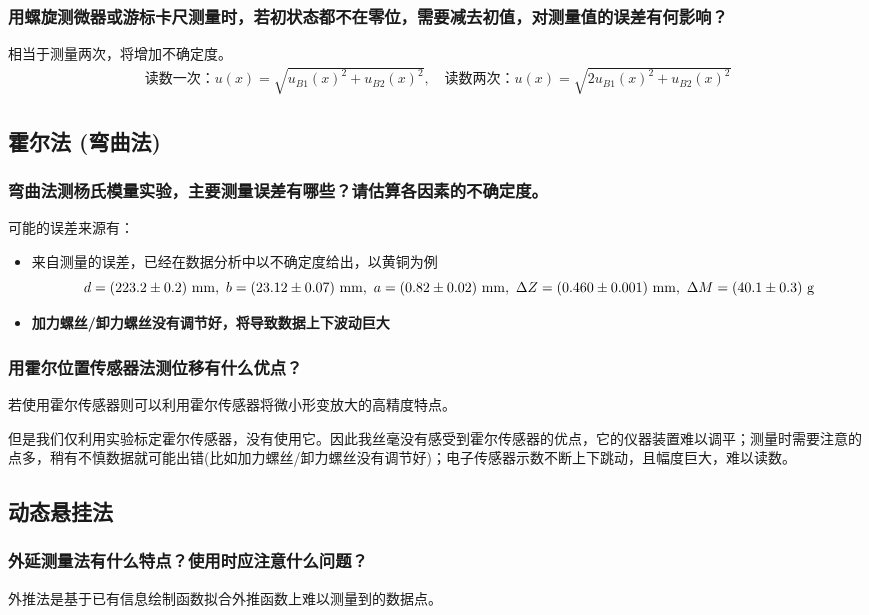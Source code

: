 \documentclass[11pt]{article}
\begin{document}
	\subsubsection{用螺旋测微器或游标卡尺测量时，若初状态都不在零位，需要减去初值，对测量值的误差有何影响？}
	相当于测量两次，将增加不确定度。
	\begin{gather*}
		\text{读数一次：} u(x) = \sqrt{u_{B1}(x)^2 + u_{B2}(x)^2 },\quad 
		\text{读数两次：} u(x) = \sqrt{2u_{B1}(x)^2 + u_{B2}(x)^2 }
	\end{gather*}
	
	\subsection{霍尔法 (弯曲法)}
	\subsubsection{弯曲法测杨氏模量实验，主要测量误差有哪些？请估算各因素的不确定度。}
	可能的误差来源有：
	\begin{itemize}
		\item 来自测量的误差，已经在数据分析中以不确定度给出，以黄铜为例
		\[d=(223.2\pm 0.2)\,\, {\rm mm},\ b=(23.12\pm 0.07)\,\, {\rm mm}, \ a=(0.82\pm 0.02)\,\,  {\rm mm}, \ \Delta Z = (0.460 \pm 0.001) \ \mathrm{mm},\
		\Delta M = (40.1 \pm 0.3) \ \mathrm{g}\]
		\item \textbf{加力螺丝/卸力螺丝没有调节好，将导致数据上下波动巨大}
	\end{itemize}
	\subsubsection{用霍尔位置传感器法测位移有什么优点？}
	若使用霍尔传感器则可以利用霍尔传感器将微小形变放大的高精度特点。
	
	但是我们仅利用实验标定霍尔传感器，没有使用它。因此我丝毫没有感受到霍尔传感器的优点，它的仪器装置难以调平；测量时需要注意的点多，稍有不慎数据就可能出错(比如加力螺丝/卸力螺丝没有调节好)；电子传感器示数不断上下跳动，且幅度巨大，难以读数。
	\subsection{动态悬挂法}
	\subsubsection{外延测量法有什么特点？使用时应注意什么问题？}
	外推法是基于已有信息绘制函数拟合外推函数上难以测量到的数据点。
	
\end{document}
